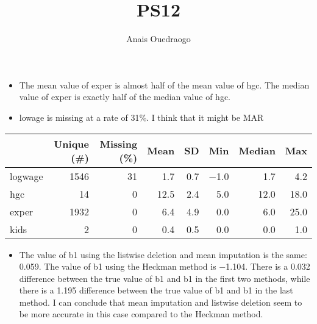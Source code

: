 \documentclass{article}
\title{PS12}
\author{Anais Ouedraogo}
\begin{document}
\maketitle


\begin{itemize}
\item The mean value of exper is almost half of the mean value of hgc. The median value of exper is exactly half of the median value of hgc.
\item lowage is missing at a rate of 31\%. I think that it might be MAR
\end{itemize}


\begin{table}
\centering
\begin{tabular}[t]{lrrrrrrr}
\toprule
  & Unique (\#) & Missing (\%) & Mean & SD & Min & Median & Max\\
\midrule
logwage & 1546 & 31 & \num{1.7} & \num{0.7} & \num{-1.0} & \num{1.7} & \num{4.2}\\
hgc & 14 & 0 & \num{12.5} & \num{2.4} & \num{5.0} & \num{12.0} & \num{18.0}\\
exper & 1932 & 0 & \num{6.4} & \num{4.9} & \num{0.0} & \num{6.0} & \num{25.0}\\
kids & 2 & 0 & \num{0.4} & \num{0.5} & \num{0.0} & \num{0.0} & \num{1.0}\\
\bottomrule
\end{tabular}
\end{table}

\begin{itemize}
\item The value of b1​ using the listwise deletion and mean imputation is the same: 0.059. The value of b1​ using the Heckman method is −1.104. There is a 0.032 difference between the true value of b1​ and b1​ in the first two methods, while there is a 1.195 difference between the true value of b1​ and b1​ in the last method. I can conclude that mean imputation and listwise deletion seem to be more accurate in this case compared to the Heckman method.
\end{itemize}
\end{document}
